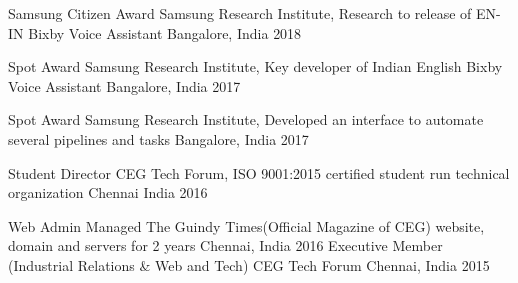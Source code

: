 



\begin{cvhonors}


  \cvhonor
    {Samsung Citizen Award} %
    {Samsung Research Institute, Research to release of EN-IN Bixby Voice Assistant} %
    {Bangalore, India} %
    {2018} %

  \cvhonor
    {Spot Award} %
    {Samsung Research Institute, Key developer of Indian English Bixby Voice Assistant} %
    {Bangalore, India} %
    {2017} %

  \cvhonor
    {Spot Award} %
    {Samsung Research Institute, Developed an interface to automate several pipelines and tasks} %
    {Bangalore, India} %
    {2017} %

  \cvhonor
    {Student Director} %
    {CEG Tech Forum, ISO 9001:2015 certified student run technical organization} %
    {Chennai India} %
    {2016} %

  \cvhonor
  {Web Admin} %
  {Managed The Guindy Times(Official Magazine of CEG) website, domain and servers for 2 years} %
  {Chennai, India} %
  {2016} %
%
  \cvhonor
    {Executive Member (Industrial Relations \& Web and Tech)} %
    {CEG Tech Forum} %
    {Chennai, India} %
    {2015} %
%
\end{cvhonors}
